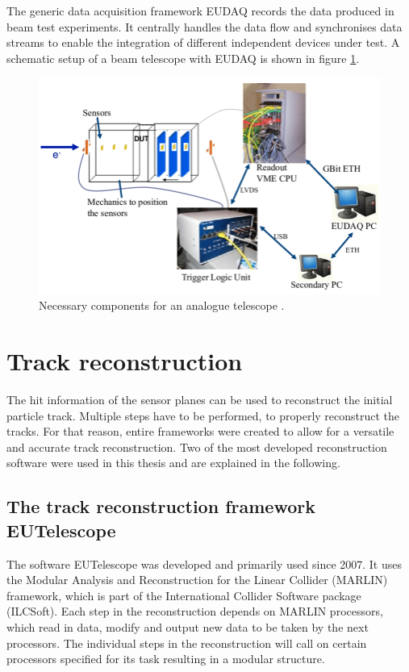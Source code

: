 The generic data acquisition framework EUDAQ \cite{eudaq} records the data produced in beam test experiments. It centrally handles the data flow and synchronises data streams to enable
the integration of different independent devices under test. A schematic setup of a beam telescope with EUDAQ is shown in figure \ref{fig:eudaq_bild}.

\begin{figure}
  \centering
  \includegraphics[height=0.4\textwidth]{images/eudaq_2.png}
  \caption{Necessary components for an analogue telescope \cite{eudaq_bild_2}.}
  \label{fig:eudaq_bild}
\end{figure}

\chapter{Track reconstruction}
The hit information of the sensor planes can be used to reconstruct the initial particle track. Multiple steps have to
be performed, to properly reconstruct the tracks. For that reason, entire frameworks were created to allow for a versatile and accurate track reconstruction. Two of the most
developed reconstruction software were used in this thesis and are explained in the following.

\section{The track reconstruction framework EUTelescope}
The software EUTelescope was developed and
primarily used since 2007. It uses the Modular Analysis and Reconstruction for the Linear Collider (MARLIN) framework, which is part of the
International Collider Software package (ILCSoft). Each step in the reconstruction depends on MARLIN processors, which read in data, modify and output new data to be
taken by the next processors. The individual steps in the reconstruction will call on certain processors specified for its task resulting in a
modular structure.

